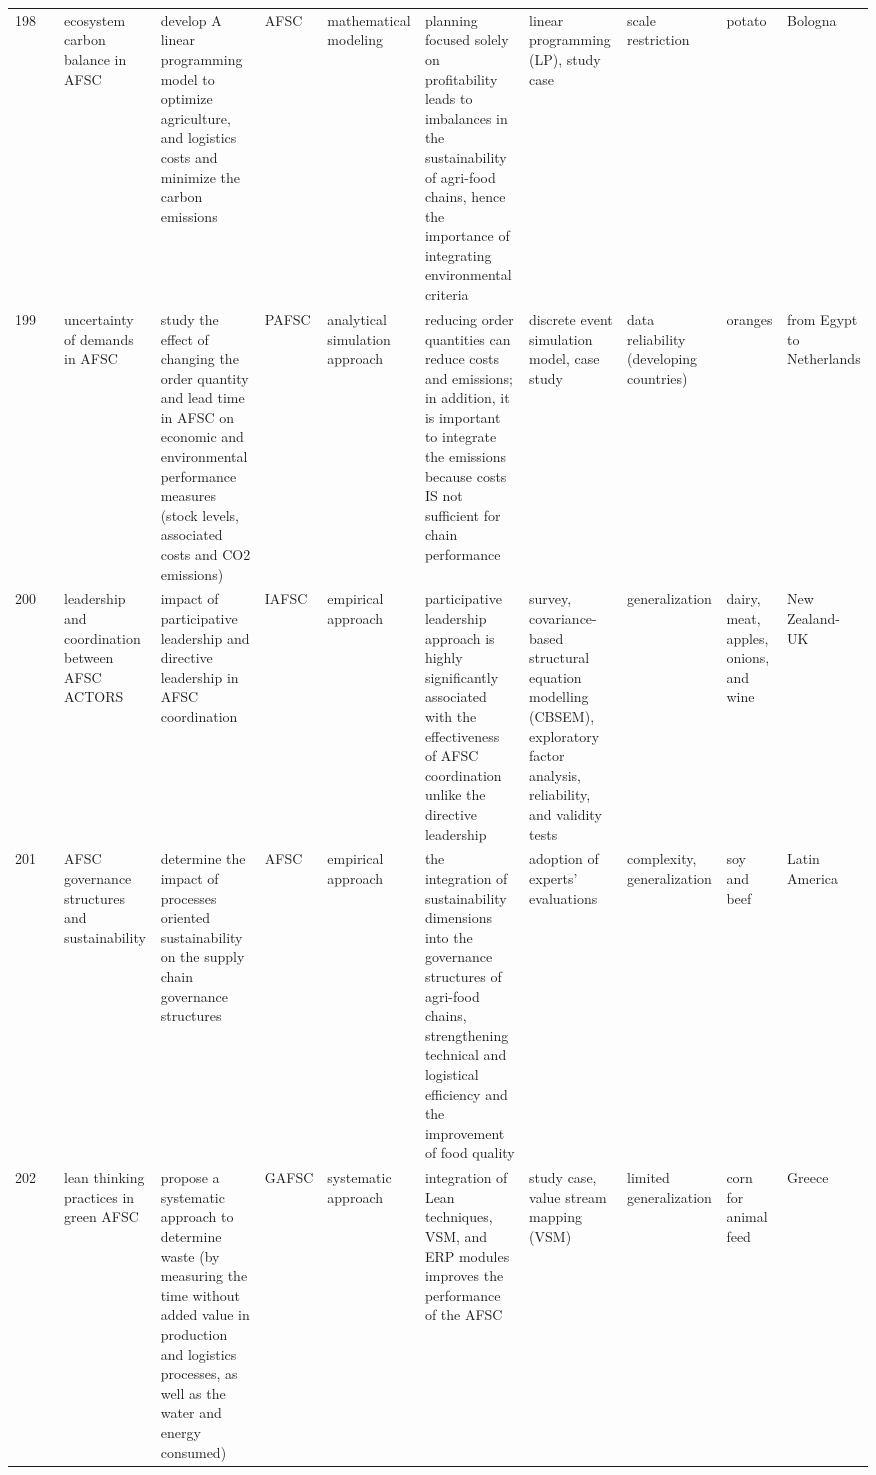 \documentclass[a4paper,10pt]{article}
\begin{document}
\begin{landscape}
\begin{small}
\begin{longtable}{p{0.5cm} p{2cm} p{2.5cm} p{4cm} p{1cm} p{2.5cm} p{5.5cm} p{2.5cm} p{2.5cm} p{1.8cm} p{1.5cm}}
198 & \textcite{Accorsi202} &ecosystem carbon balance in AFSC & develop A linear programming model to optimize agriculture, and logistics costs  and minimize the carbon emissions  &AFSC & mathematical modeling& planning focused solely on profitability leads to imbalances in the sustainability of agri-food chains, hence the importance of integrating environmental criteria &linear programming (LP), study case & scale restriction & potato& Bologna  \\
199 & \textcite{Galal203} &uncertainty of demands in AFSC & study the effect of changing the order quantity and lead time in AFSC on economic and environmental performance measures (stock levels, associated costs and CO2 emissions)&PAFSC & analytical simulation approach& reducing order quantities can reduce costs and emissions; in addition, it is important to integrate the emissions because costs IS not sufficient for chain performance  &discrete event simulation model, case study& data reliability (developing countries)& oranges& from Egypt to  Netherlands  \\
200 & \textcite{Akhtar204} &leadership and coordination between AFSC ACTORS & impact of participative leadership  and  directive leadership in AFSC coordination&IAFSC & empirical approach& participative leadership approach is highly significantly  associated with the effectiveness of AFSC coordination unlike the directive leadership &survey, covariance-based structural equation modelling (CBSEM), exploratory factor analysis, reliability, and validity tests & generalization& dairy, meat, apples, onions, and wine& New Zealand-UK  \\
201 & \textcite{Rota205} &AFSC governance structures and sustainability & determine  the impact of  processes oriented sustainability  on the supply chain governance structures  &AFSC & empirical approach& the integration of sustainability dimensions into the governance structures of agri-food chains, strengthening technical and logistical efficiency and the improvement of food quality&adoption of experts’ evaluations & complexity, generalization& soy and beef& Latin America  \\
202 & \textcite{Folinas206} &lean thinking practices in green AFSC & propose a systematic approach to determine waste (by measuring the time without added value in production and logistics processes, as well as the water and energy consumed)  &GAFSC & systematic approach&  integration of Lean techniques, VSM, and ERP modules  improves the performance of the AFSC &study case, value stream mapping (VSM) & limited generalization& corn for animal feed&  Greece   \\

\end{longtable}
\end{small}
\end{landscape}
\end{document}
